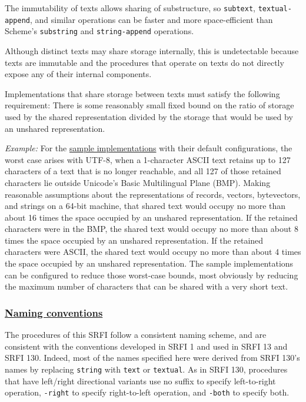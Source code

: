 The immutability of texts allows sharing of substructure, so
\texttt{subtext}, \texttt{textual-append}, and similar operations can be
faster and more space-efficient than Scheme's \texttt{substring} and
\texttt{string-append} operations.

Although distinct texts may share storage internally, this is
undetectable because texts are immutable and the procedures that operate
on texts do not directly expose any of their internal components.

Implementations that share storage between texts must satisfy the
following requirement: There is some reasonably small fixed bound on the
ratio of storage used by the shared representation divided by the
storage that would be used by an unshared representation.

\emph{Example:} For the \protect\hyperlink{SampleImp}{sample
implementations} with their default configurations, the worst case
arises with UTF-8, when a 1-character ASCII text retains up to 127
characters of a text that is no longer reachable, and all 127 of those
retained characters lie outside Unicode's Basic Multilingual Plane
(BMP). Making reasonable assumptions about the representations of
records, vectors, bytevectors, and strings on a 64-bit machine, that
shared text would occupy no more than about 16 times the space occupied
by an unshared representation. If the retained characters were in the
BMP, the shared text would occupy no more than about 8 times the space
occupied by an unshared representation. If the retained characters were
ASCII, the shared text would occupy no more than about 4 times the space
occupied by an unshared representation. The sample implementations can
be configured to reduce those worst-case bounds, most obviously by
reducing the maximum number of characters that can be shared with a very
short text.

\subsubsection{\texorpdfstring{\href{}{Naming
conventions}}{Naming conventions}}\label{naming-conventions}

The procedures of this SRFI follow a consistent naming scheme, and are
consistent with the conventions developed in SRFI 1 and used in SRFI 13
and SRFI 130. Indeed, most of the names specified here were derived from
SRFI 130's names by replacing \texttt{string} with \texttt{text} or
\texttt{textual}. As in SRFI 130, procedures that have left/right
directional variants use no suffix to specify left-to-right operation,
\texttt{-right} to specify right-to-left operation, and \texttt{-both}
to specify both.

